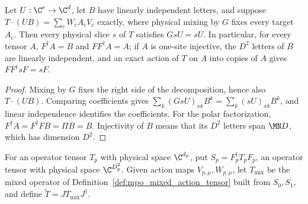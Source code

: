 \begin{lemma}
    \label{thm:mpo_support_invariance}
    \leanok
    Let $U:\C^e\to\C^d$, let $B$ have linearly independent letters, and
    suppose $T\cdot(UB)=\sum_cW_cA_cV_c$ exactly, where physical mixing
    by $G$ fixes every target $A_c$. Then every physical slice $s$ of
    $T$ satisfies $GsU=sU$. In particular, for every tensor $A$,
    $F^\dagger A=B$ and $FF^\dagger A=A$; if $A$ is one-site injective,
    the $D^2$ letters of $B$ are linearly independent, and an exact action
    of $T$ on $A$ into copies of $A$ gives $FF^\dagger sF=sF$.
\end{lemma}
\begin{proof}
    \leanok
    Mixing by $G$ fixes the right side of the decomposition, hence also
    $T\cdot(UB)$. Comparing coefficients gives
    $\sum_k(GsU)_{xk}B^k=\sum_k(sU)_{xk}B^k$, and linear independence
    identifies the coefficients. For the polar factorization,
    $F^\dagger A=F^\dagger FB=\Pi B=B$. Injectivity of $B$ means that
    its $D^2$ letters span $\MN D$, which has dimension $D^2$.
\end{proof}

\begin{definition}
    \label{def:mpo_arbitrary_mixed_operator}
    \leanok
    For an operator tensor $T_p$ with physical space $\C^{d_p}$, put
    $S_p=F_p^\dagger T_pF_p$, an operator tensor with physical space
    $\C^{D_p^2}$. Given action maps $V_{p,\mu},W_{p,\mu}$, let
    $T_{\mathrm{mix}}$ be the mixed operator of
    Definition~\ref{def:mpo_mixed_action_tensor} built from $S_0,S_1$,
    and define $\widetilde T=JT_{\mathrm{mix}}J^\dagger$.
\end{definition}

